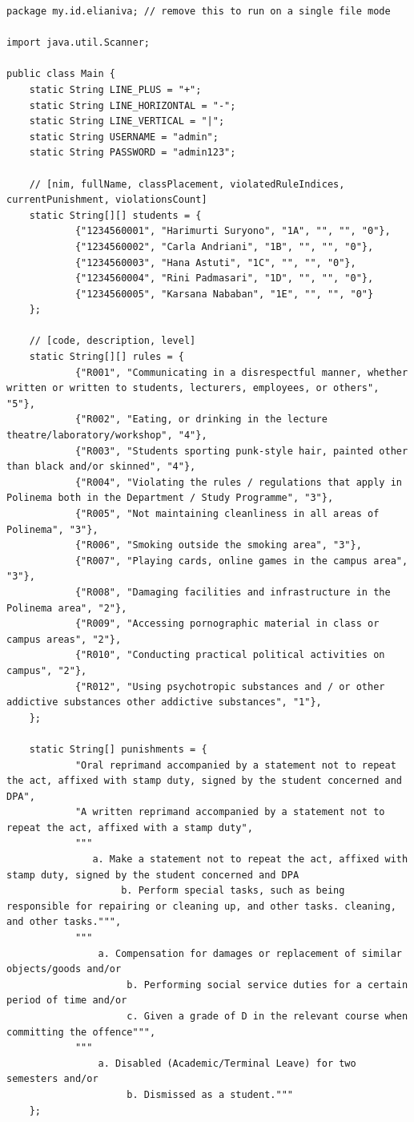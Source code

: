 \documentclass[12pt,titlepage]{article}
\begin{document}
\begin{verbatim}
package my.id.elianiva; // remove this to run on a single file mode

import java.util.Scanner;

public class Main {
    static String LINE_PLUS = "+";
    static String LINE_HORIZONTAL = "-";
    static String LINE_VERTICAL = "|";
    static String USERNAME = "admin";
    static String PASSWORD = "admin123";

    // [nim, fullName, classPlacement, violatedRuleIndices, currentPunishment, violationsCount]
    static String[][] students = {
            {"1234560001", "Harimurti Suryono", "1A", "", "", "0"},
            {"1234560002", "Carla Andriani", "1B", "", "", "0"},
            {"1234560003", "Hana Astuti", "1C", "", "", "0"},
            {"1234560004", "Rini Padmasari", "1D", "", "", "0"},
            {"1234560005", "Karsana Nababan", "1E", "", "", "0"}
    };

    // [code, description, level]
    static String[][] rules = {
            {"R001", "Communicating in a disrespectful manner, whether written or written to students, lecturers, employees, or others", "5"},
            {"R002", "Eating, or drinking in the lecture theatre/laboratory/workshop", "4"},
            {"R003", "Students sporting punk-style hair, painted other than black and/or skinned", "4"},
            {"R004", "Violating the rules / regulations that apply in Polinema both in the Department / Study Programme", "3"},
            {"R005", "Not maintaining cleanliness in all areas of Polinema", "3"},
            {"R006", "Smoking outside the smoking area", "3"},
            {"R007", "Playing cards, online games in the campus area", "3"},
            {"R008", "Damaging facilities and infrastructure in the Polinema area", "2"},
            {"R009", "Accessing pornographic material in class or campus areas", "2"},
            {"R010", "Conducting practical political activities on campus", "2"},
            {"R012", "Using psychotropic substances and / or other addictive substances other addictive substances", "1"},
    };

    static String[] punishments = {
            "Oral reprimand accompanied by a statement not to repeat the act, affixed with stamp duty, signed by the student concerned and DPA",
            "A written reprimand accompanied by a statement not to repeat the act, affixed with a stamp duty",
            """
               a. Make a statement not to repeat the act, affixed with stamp duty, signed by the student concerned and DPA
                    b. Perform special tasks, such as being responsible for repairing or cleaning up, and other tasks. cleaning, and other tasks.""",
            """
                a. Compensation for damages or replacement of similar objects/goods and/or
                     b. Performing social service duties for a certain period of time and/or
                     c. Given a grade of D in the relevant course when committing the offence""",
            """
                a. Disabled (Academic/Terminal Leave) for two semesters and/or
                     b. Dismissed as a student."""
    };


\end{verbatim}
\end{document}
